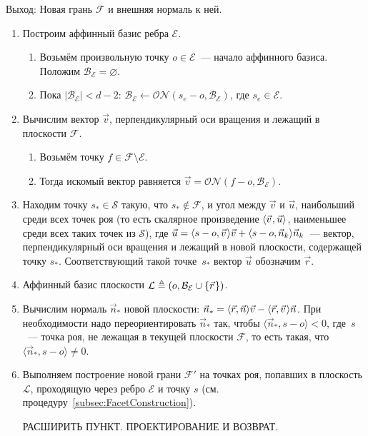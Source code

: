 \documentclass[a4paper,12pt]{article}
\newcommand{\Swarm}{\mathcal{S}}              %
\newcommand{\Facet}{\mathcal{F}}              %
\newcommand{\Edge}{\mathcal{E}}               %
\newcommand{\Basis}{\mathcal{B}}              %
\newcommand{\set}[2][]{#1\{ #2 #1\}}                    %
\newcommand{\scalprod}[3][]{#1\langle #2, #3 #1\rangle} %
\newcommand{\ONorm}[3][]{\mathcal{ON}#1( #2, #3 #1)} %
\newcommand{\Plane}{\mathcal{L}}           %
\renewcommand{\.}{\hspace{0.2ex}}
\begin{document}
    Выход: Новая грань $\Facet$ и внешняя нормаль к ней.

    \begin{enumerate}
      \item Построим аффинный базис ребра $\Edge$.
      \begin{enumerate}
        \item Возьмём произвольную точку $o \in \Edge$~--- начало аффинного базиса. Положим $\Basis_\Edge = \varnothing$.

        \item Пока $|\Basis_\Edge| < d-2$: $\Basis_\Edge \leftarrow \ONorm{s_e - o}{\Basis_\Edge}$, где $s_e \in \Edge$.
      \end{enumerate}

      \item Вычислим вектор $\vec v$, перпендикулярный оси вращения и лежащий в плоскости $\Facet$.
      \begin{enumerate}
        \item Возьмём точку $f \in \Facet \setminus \Edge$.
        \item Тогда искомый вектор равняется $\vec v = \ONorm{f - o}{\Basis_\Edge}$.
      \end{enumerate}

      \item Находим точку $s_* \in \Swarm$ такую, что $s_* \notin \Facet$, и угол между $\vec v$ и $\vec u$, наибольший среди всех точек роя (то есть скалярное произведение $\scalprod{\vec v \.}{\vec u}$, наименьшее среди всех таких точек из $\Swarm$), где $\vec u = \scalprod{s - o}{\vec v \.}\vec v + \scalprod{s - o}{\vec n_k}\vec n_k$~--- вектор, перпендикулярный оси вращения и лежащий в новой плоскости, содержащей точку $s_*$. Соответствующий такой точке~$s_*$ вектор $\vec u$ обозначим $\vec r$.

      \item Аффинный базис плоскости $\Plane \triangleq (o, \Basis_\Edge \cup \set{\vec r \.})$.

      \item Вычислим нормаль $\vec n_{*}$ новой плоскости: $\vec n_{*} = \scalprod{\vec r}{\vec n}\vec v - \scalprod{\vec r}{\vec v \.}\vec n$. При необходимости надо переориентировать $\vec n_{*}$ так, чтобы $\scalprod{\vec n_{*}}{s - o} < 0$, где~$s$~--- точка роя, не лежащая в текущей плоскости $\Facet$, то есть такая, что $\scalprod{\vec n_{*}}{s - o} \neq 0$.

      \item Выполняем построение новой грани $\Facet'$ на точках роя, попавших в плоскость $\Plane$, проходящую через ребро $\Edge$ и точку $s$ (см. процедуру~\ref{subsec:FacetConstruction}).

      РАСШИРИТЬ ПУНКТ. ПРОЕКТИРОВАНИЕ И ВОЗВРАТ.
    \end{enumerate}
\end{document}
